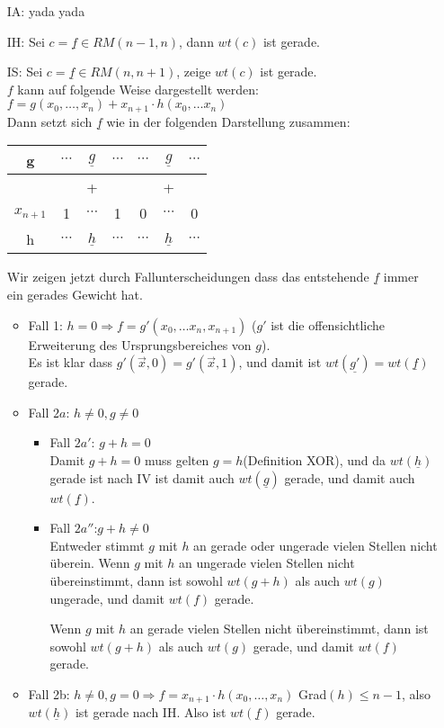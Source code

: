 \begin{itemize}
	\item[IA:] yada yada
	\item[IH:] Sei $c = \underline{f} \in RM(n-1,n)$, dann $wt(c)$ ist gerade.
	\item[IS:] Sei $c = \underline{f} \in RM(n,n+1)$, zeige $wt(c)$ ist gerade.\\
	$f$ kann auf folgende Weise dargestellt werden:\\
	$f = g(x_0,\ldots,x_n) + x_{n+1}\cdot h(x_0,\ldots x_n)$\\
	Dann setzt sich $\underline{f}$ wie in der folgenden Darstellung zusammen:\\
	\begin{tabular}{|c|ccc|ccc|}
	\hline 
	g & $\cdots$ & $\underline{g}$ & $\cdots$ & $\cdots$ & $\underline{g}$ & $\cdots$ \\ 
	\hline 
	 &  & + &  &  & + &  \\ 
	\hline 
	$x_{n+1}$ & 1 & $\cdots$ & 1 & 0 & $\cdots$ & 0 \\ 
	\hline 
	h & $\cdots$ & $\underline{h}$ & $\cdots$ & $\cdots$ & $\underline{h}$ & $\cdots$ \\ 
	\hline
	\end{tabular}
	
	Wir zeigen jetzt durch Fallunterscheidungen dass das entstehende $\underline{f}$ immer ein gerades Gewicht hat.
	\begin{itemize}
		\item Fall 1: $h = 0 \Rightarrow f = g'(x_0, \ldots x_n,x_{n+1})$ ($g'$ ist die offensichtliche Erweiterung des Ursprungsbereiches von $g$).\\
		Es ist klar dass $g'(\vec{x},0) = g'(\vec{x},1)$, und damit ist $wt(\underline{g'}) = wt(\underline{f})$ gerade.
		\item Fall $2a$: $h \neq 0, g \neq 0$
			\begin{itemize}
			\item Fall $2a'$: $g + h = 0$\\
			Damit $g + h = 0$ muss gelten $g = h$(Definition XOR), und da $wt(\underline{h})$ gerade ist nach IV ist damit auch $wt(\underline{g})$ gerade, und damit auch $wt(\underline{f})$.
			\item Fall $2a''$:$g + h \neq 0$\\
			Entweder stimmt $g$ mit $h$ an gerade oder ungerade vielen Stellen nicht überein.
			Wenn $g$ mit $h$ an ungerade vielen Stellen nicht übereinstimmt, dann ist sowohl $wt(g+h)$ als auch $wt(g)$ ungerade, und damit $wt(f)$ gerade.
			
			Wenn $g$ mit $h$ an gerade vielen Stellen nicht übereinstimmt, dann ist sowohl $wt(g+h)$ als auch $wt(g)$ gerade, und damit $wt(f)$ gerade.
			\end{itemize}
		\item Fall 2b: $h \neq 0, g = 0\Rightarrow f = x_{n+1}\cdot h(x_0,\ldots,x_n)$
		Grad$(h) \leq n-1$, also $wt(\underline{h})$ ist gerade nach IH.
		Also ist $wt(\underline{f})$ gerade.
	\end{itemize}
\end{itemize}

